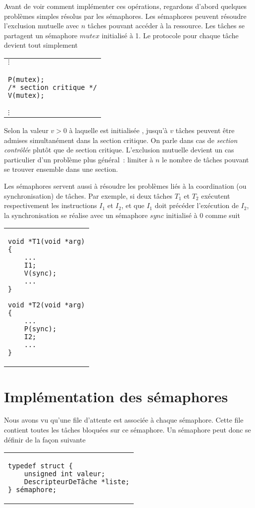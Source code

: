 \par
Avant de voir comment implémenter ces opérations, regardons d'abord quelques problèmes simples résolus par les sémaphores.
Les sémaphores peuvent résoudre l'exclusion mutuelle avec $n$ tâches pouvant accéder à la ressource.
Les tâches se partagent un sémaphore $mutex$ initialisé à 1.  Le protocole pour chaque tâche devient tout simplement
\centering
\begin{tabular}{l}
\hspace{0.6 cm}$\vdots$ \\
\begin{lstlisting}
P(mutex);
/* section critique */
V(mutex);
\end{lstlisting} \\
\hspace{0.6 cm}$\vdots$
\end{tabular}

\par
Selon la valeur $v>0$ à laquelle est initialisée , jusqu'à $v$ tâches peuvent être admises simultanément dans la section critique.  On parle dans cas de {\em section contrôlée} plutôt que de section critique.  L'exclusion mutuelle devient un cas particulier d'un problème plus général~:  limiter à $n$ le nombre de tâches pouvant se trouver ensemble dans une section.

Les sémaphores servent aussi à résoudre les problèmes liés à la coordination (ou synchronisation) de tâches.  Par exemple, si deux tâches $T_1$ et $T_2$ exécutent respectivement les instructions $I_1$ et $I_2$, et que $I_1$ doit précéder l'exécution de $I_2$, la synchronisation se réalise avec un sémaphore $sync$ initialisé à 0 comme
suit
\centering
\begin{tabular}{l}
\begin{lstlisting}
void *T1(void *arg)
{
	...
	I1;
	V(sync);
	...
}
\end{lstlisting}
\hspace{1 cm}
\begin{lstlisting}
void *T2(void *arg)
{
	...
	P(sync);
	I2;
	...
}
\end{lstlisting}
\end{tabular}


\section{Implémentation des sémaphores}
Nous avons vu qu'une file d'attente est associée à chaque sémaphore. Cette file contient toutes les tâches bloquées sur ce sémaphore.  Un sémaphore peut donc se définir de la façon suivante
\centering
\begin{tabular}{l}
\begin{lstlisting}
typedef struct {
	unsigned int valeur;
	DescripteurDeTâche *liste;
} sémaphore;
\end{lstlisting}
\end{tabular}

